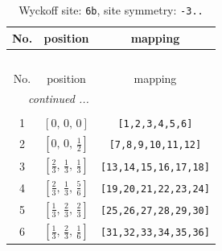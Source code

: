 \documentclass[fleqn,8pt]{jsarticle}
\begin{document}
\begin{longtable}{ccc}
\caption{Wyckoff site: {\tt 6b}, site symmetry: {\tt -3..}}
 \\
 \hline \hline
No. & position & mapping \\ \hline \endfirsthead

\multicolumn{2}{l}{\tablename\ \thetable{}} \\
 \hline \hline
No. & position & mapping \\ \hline \endhead

 \hline \hline
\multicolumn{2}{r}{\footnotesize\it continued ...} \\ \endfoot

 \hline \hline
\multicolumn{2}{r}{} \\ \endlastfoot

1 & $\left[ 0,\, 0,\, 0 \right]$ & {\tt [1,2,3,4,5,6]} \\ \hline
2 & $\left[ 0,\, 0,\, \frac{1}{2} \right]$ & {\tt [7,8,9,10,11,12]} \\ \hline
3 & $\left[ \frac{2}{3},\, \frac{1}{3},\, \frac{1}{3} \right]$ & {\tt [13,14,15,16,17,18]} \\ \hline
4 & $\left[ \frac{2}{3},\, \frac{1}{3},\, \frac{5}{6} \right]$ & {\tt [19,20,21,22,23,24]} \\ \hline
5 & $\left[ \frac{1}{3},\, \frac{2}{3},\, \frac{2}{3} \right]$ & {\tt [25,26,27,28,29,30]} \\ \hline
6 & $\left[ \frac{1}{3},\, \frac{2}{3},\, \frac{1}{6} \right]$ & {\tt [31,32,33,34,35,36]} \\
\end{longtable}
\renewcommand{\arraystretch}{1.2}
\end{document}
